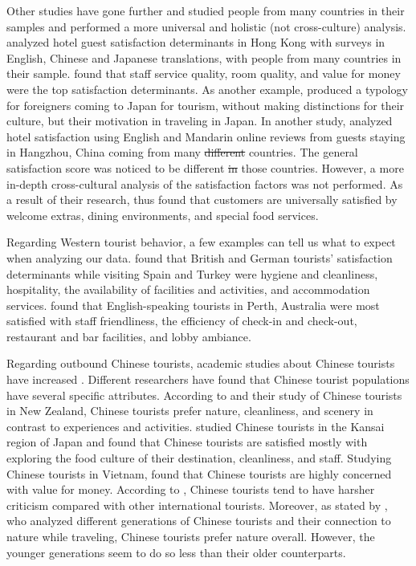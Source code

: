 \documentclass[smallextended,natbib]{svjour3}       %
\providecommand{\DIFadd}[1]{{\protect\color{blue}\uwave{#1}}} %
\providecommand{\DIFdel}[1]{{\protect\color{red}\sout{#1}}}                      %
\providecommand{\DIFaddbegin}{} %
\providecommand{\DIFaddend}{} %
\providecommand{\DIFdelbegin}{} %
\providecommand{\DIFdelend}{} %
\newcommand{\DIFscaledelfig}{0.5}
\newlength{\DIFdelgraphicswidth} %
\newlength{\DIFdelgraphicsheight} %
\newcommand{\DIFaddincludegraphics}[2][]{{\color{blue}\fbox{\DIFOincludegraphics[#1]{#2}}}} %
\newcommand{\DIFdelincludegraphics}[2][]{%
\sbox{\DIFdelgraphicsbox}{\DIFOincludegraphics[#1]{#2}}%
\settoboxwidth{\DIFdelgraphicswidth}{\DIFdelgraphicsbox} %
\settoboxtotalheight{\DIFdelgraphicsheight}{\DIFdelgraphicsbox} %
\scalebox{\DIFscaledelfig}{%
\parbox[b]{\DIFdelgraphicswidth}{\usebox{\DIFdelgraphicsbox}\\[-\baselineskip] \rule{\DIFdelgraphicswidth}{0em}}\llap{\resizebox{\DIFdelgraphicswidth}{\DIFdelgraphicsheight}{%
\setlength{\unitlength}{\DIFdelgraphicswidth}%
\begin{picture}(1,1)%
\thicklines\linethickness{2pt} %
{\color[rgb]{1,0,0}\put(0,0){\framebox(1,1){}}}%
{\color[rgb]{1,0,0}\put(0,0){\line( 1,1){1}}}%
{\color[rgb]{1,0,0}\put(0,1){\line(1,-1){1}}}%
\end{picture}%
}\hspace*{3pt}}} %
} %
\DeclareRobustCommand{\DIFaddbegin}{\DIFOaddbegin \let\includegraphics\DIFaddincludegraphics} %
\DeclareRobustCommand{\DIFaddend}{\DIFOaddend \let\includegraphics\DIFOincludegraphics} %
\DeclareRobustCommand{\DIFdelbegin}{\DIFOdelbegin \let\includegraphics\DIFdelincludegraphics} %
\DeclareRobustCommand{\DIFdelend}{\DIFOaddend \let\includegraphics\DIFOincludegraphics} %
\begin{document}
    Other studies have gone further and studied people from many countries in their samples and performed a more universal and holistic (not cross-culture) analysis. \cite{choi2001} analyzed hotel guest satisfaction determinants in Hong Kong with surveys in English, Chinese and Japanese translations, with people from many countries in their sample. \cite{choi2001} found that staff service quality, room quality, and value for money were the top satisfaction determinants. As another example, \cite{Uzama2012} produced a typology for foreigners coming to Japan for tourism, without making distinctions for their culture, but their motivation in traveling in Japan. In another study, \cite{zhou2014} analyzed hotel satisfaction using English and Mandarin online reviews from guests staying in Hangzhou, China coming from many \DIFdelbegin \DIFdel{different }\DIFdelend countries. The general satisfaction score was noticed to be different \DIFdelbegin \DIFdel{in }\DIFdelend \DIFaddbegin \DIFadd{among }\DIFaddend those countries. However, a more in-depth cross-cultural analysis of the satisfaction factors was not performed. As a result of their research, \cite{zhou2014} thus found that customers are universally satisfied by welcome extras, dining environments, and special food services. 

    Regarding Western tourist behavior, a few examples can tell us what to expect when analyzing our data. \cite{kozak2002} found that British and German tourists' satisfaction determinants while visiting Spain and Turkey were hygiene and cleanliness, hospitality, the availability of facilities and activities, and accommodation services. \cite{shanka2004} found that English-speaking tourists in Perth, Australia were most satisfied with staff friendliness, the efficiency of check-in and check-out, restaurant and bar facilities, and lobby ambiance. 

    Regarding outbound Chinese tourists, academic studies about Chinese tourists have increased \cite[][]{sun2017}. Different researchers have found that Chinese tourist populations have several specific attributes. According to \cite{ryan2001} and their study of Chinese tourists in New Zealand, Chinese tourists prefer nature, cleanliness, and scenery in contrast to experiences and activities. \cite{dongyang2015} studied Chinese tourists in the Kansai region of Japan and found that Chinese tourists are satisfied mostly with exploring the food culture of their destination, cleanliness, and staff. Studying Chinese tourists in Vietnam, \cite{truong2009} found that Chinese tourists are highly concerned with value for money. According to \cite{liu2019}, Chinese tourists tend to have harsher criticism compared with other international tourists. Moreover, as stated by \cite{gao2017chinese}, who analyzed different generations of Chinese tourists and their connection to nature while traveling, Chinese tourists prefer nature overall. However, the younger generations seem to do so less than their older counterparts. 
\end{document}
